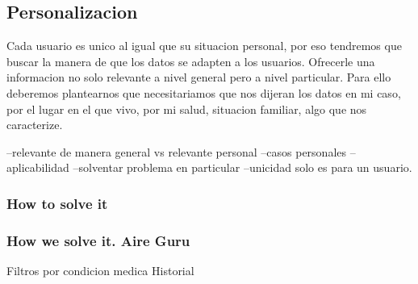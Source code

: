 \subsection{Personalizacion}
Cada usuario es unico al igual que su situacion personal, por eso tendremos que buscar la manera de que los datos se 
adapten a los usuarios. Ofrecerle una informacion no solo relevante a nivel general pero a nivel particular.
Para ello deberemos plantearnos que necesitariamos que nos dijeran los datos en mi caso, por el lugar en el que vivo, por
mi salud, situacion familiar, algo que nos caracterize.
 
    --relevante de manera general vs relevante personal
    --casos personales
    --aplicabilidad
    --solventar problema en particular
    --unicidad solo es para un usuario.
    

  

\subsubsection{How to solve it} 


\subsubsection{How we solve it. Aire Guru} 
Filtros por condicion medica
Historial
 
\begin{itemize}
    \done
    \crossed
    
\end{itemize}
 \newpage